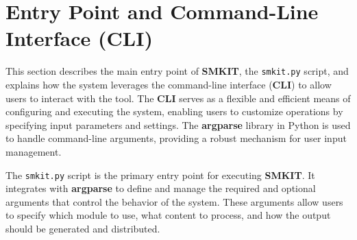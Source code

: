 \section{Entry Point and Command-Line Interface (CLI)}
\label{sec:entry_point_and_command_line_interface_cli}

This section describes the main entry point of \textbf{SMKIT}, the \texttt{smkit.py} script, and explains how the system leverages the command-line interface (\textbf{CLI}) to allow users to interact with the tool. The \textbf{CLI} serves as a flexible and efficient means of configuring and executing the system, enabling users to customize operations by specifying input parameters and settings. The \textbf{argparse} library in Python is used to handle command-line arguments, providing a robust mechanism for user input management.

The \texttt{smkit.py} script is the primary entry point for executing \textbf{SMKIT}. It integrates with \textbf{argparse} to define and manage the required and optional arguments that control the behavior of the system. These arguments allow users to specify which module to use, what content to process, and how the output should be generated and distributed.

